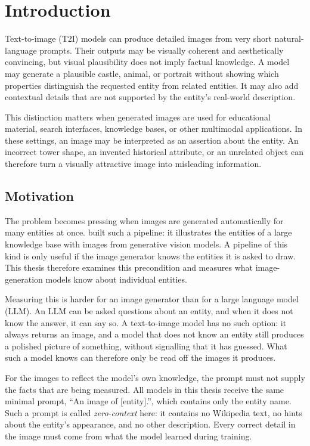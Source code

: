 \chapter{Introduction}

Text-to-image (T2I) models can produce detailed images from very short
natural-language prompts. Their outputs may be visually coherent and
aesthetically convincing, but visual plausibility does not imply factual
knowledge. A model may generate a plausible castle, animal, or portrait without
showing which properties distinguish the requested entity from related entities.
It may also add contextual details that are not supported by the entity's
real-world description.

This distinction matters when generated images are used for educational
material, search interfaces, knowledge bases, or other multimodal applications.
In these settings, an image may be interpreted as an assertion about the entity.
An incorrect tower shape, an invented historical attribute, or an unrelated
object can therefore turn a visually attractive image into misleading
information.

\section{Motivation}
\label{sec:motivation}

The problem becomes pressing when images are generated automatically for many
entities at once. \citet{brinster2025} built such a pipeline: it
illustrates the entities of a large knowledge base with images from generative
vision models. A pipeline of this kind is only useful if the image generator
knows the entities it is asked to draw. This thesis therefore examines this
precondition and measures what image-generation models know about individual
entities.

Measuring this is harder for an image generator than for a large language
model (LLM). An LLM can be asked questions about an entity, and when it does
not know the answer, it can say so. A text-to-image model has no such option:
it always returns an image, and a model that does not know an entity still
produces a polished picture of something, without signalling that it has
guessed. What such a model knows can therefore only be read off the images it
produces.

For the images to reflect the model's own knowledge, the prompt must not
supply the facts that are being measured. All models in this thesis receive
the same minimal prompt, ``An image of [entity].'', which contains only the
entity name. Such a prompt is called \emph{zero-context} here: it
contains no Wikipedia text, no hints about the entity's appearance, and no
other description. Every correct detail in the image must come from what the
model learned during training.


